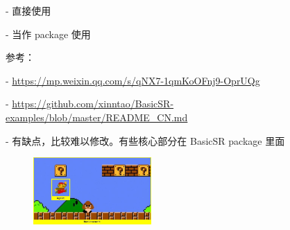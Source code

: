 \documentclass[../main.tex]{subfiles}
\begin{document}
- 直接使用

- 当作 package 使用

参考：

- \url{https://mp.weixin.qq.com/s/qNX7-1qmKoOFnj9-OprUQg}

- \url{https://github.com/xinntao/BasicSR-examples/blob/master/README_CN.md}

- 有缺点，比较难以修改。有些核心部分在 BasicSR package 里面

\begin{figure}
	\centering
	\includegraphics[width=0.4\textwidth]{figures/agentenv.png}
\end{figure}
\end{document}
